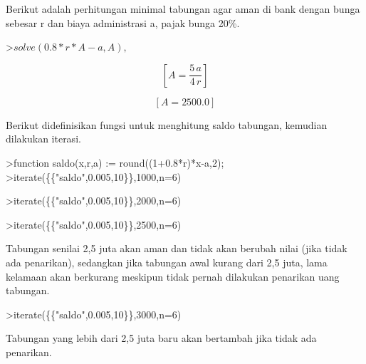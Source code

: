 \documentclass[a4paper,10pt]{article}
\begin{document}
\begin{eulernotebook}
\begin{eulercomment}
\begin{eulercomment}
\begin{eulercomment}
\begin{eulercomment}
\begin{eulercomment}
Berikut adalah perhitungan minimal tabungan agar aman di bank dengan bunga sebesar r dan
biaya administrasi a, pajak bunga 20\%.
\end{eulercomment}
\begin{eulerprompt}
>$solve(0.8*r*A-a,A), $%
\end{eulerprompt}
\begin{eulerformula}
\[
\left[ A=\frac{5\,a}{4\,r} \right] 
\]
\end{eulerformula}
\begin{eulerformula}
\[
\left[ A=2500.0 \right] 
\]
\end{eulerformula}
\begin{eulercomment}
Berikut didefinisikan fungsi untuk menghitung saldo tabungan, kemudian dilakukan iterasi.
\end{eulercomment}
\begin{eulerprompt}
>function saldo(x,r,a) := round((1+0.8*r)*x-a,2);
>iterate(\{\{"saldo",0.005,10\}\},1000,n=6)
\end{eulerprompt}
\begin{euleroutput}
  [1000,  994,  987.98,  981.93,  975.86,  969.76,  963.64]
\end{euleroutput}
\begin{eulerprompt}
>iterate(\{\{"saldo",0.005,10\}\},2000,n=6)
\end{eulerprompt}
\begin{euleroutput}
  [2000,  1998,  1995.99,  1993.97,  1991.95,  1989.92,  1987.88]
\end{euleroutput}
\begin{eulerprompt}
>iterate(\{\{"saldo",0.005,10\}\},2500,n=6)
\end{eulerprompt}
\begin{euleroutput}
  [2500,  2500,  2500,  2500,  2500,  2500,  2500]
\end{euleroutput}
\begin{eulercomment}
Tabungan senilai 2,5 juta akan aman dan tidak akan berubah nilai (jika tidak ada penarikan),
sedangkan jika tabungan awal kurang dari 2,5 juta, lama kelamaan akan berkurang meskipun
tidak pernah dilakukan penarikan uang tabungan.
\end{eulercomment}
\begin{eulerprompt}
>iterate(\{\{"saldo",0.005,10\}\},3000,n=6)
\end{eulerprompt}
\begin{euleroutput}
  [3000,  3002,  3004.01,  3006.03,  3008.05,  3010.08,  3012.12]
\end{euleroutput}
\begin{eulercomment}
Tabungan yang lebih dari 2,5 juta baru akan bertambah jika tidak ada penarikan.


\end{eulercomment}
\end{eulercomment}
\end{eulercomment}
\end{eulercomment}
\end{eulercomment}
\end{eulernotebook}
\end{document}
